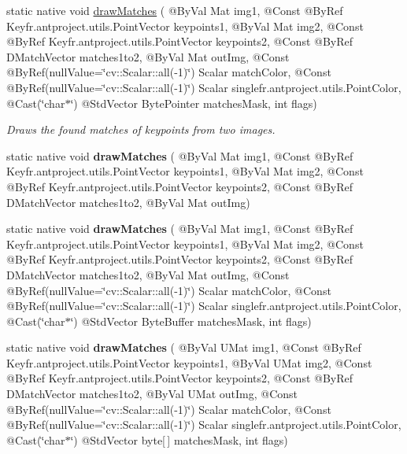 \begin{DoxyCompactItemize}
\item 
static native void \hyperlink{group__features2d__draw_gac84f37b93a8b6d5358211ec9b6d4799e}{draw\+Matches} ( @By\+Val Mat img1, @Const @By\+Ref Key\+fr.antproject.utils.Point\+Vector keypoints1, @By\+Val Mat img2, @Const @By\+Ref Key\+fr.antproject.utils.Point\+Vector keypoints2, @Const @By\+Ref D\+Match\+Vector matches1to2, @By\+Val Mat out\+Img, @Const @By\+Ref(null\+Value=\char`\"{}cv\+::\+Scalar\+::all(-\/1)\char`\"{}) Scalar match\+Color, @Const @By\+Ref(null\+Value=\char`\"{}cv\+::\+Scalar\+::all(-\/1)\char`\"{}) Scalar single\+fr.antproject.utils.Point\+Color, @Cast(\char`\"{}char$\ast$\char`\"{}) @Std\+Vector Byte\+Pointer matches\+Mask, int flags)
\begin{DoxyCompactList}\small\item\em Draws the found matches of keypoints from two images. \end{DoxyCompactList}\item 
static native void {\bfseries draw\+Matches} ( @By\+Val Mat img1, @Const @By\+Ref Key\+fr.antproject.utils.Point\+Vector keypoints1, @By\+Val Mat img2, @Const @By\+Ref Key\+fr.antproject.utils.Point\+Vector keypoints2, @Const @By\+Ref D\+Match\+Vector matches1to2, @By\+Val Mat out\+Img)
\item 
static native void {\bfseries draw\+Matches} ( @By\+Val Mat img1, @Const @By\+Ref Key\+fr.antproject.utils.Point\+Vector keypoints1, @By\+Val Mat img2, @Const @By\+Ref Key\+fr.antproject.utils.Point\+Vector keypoints2, @Const @By\+Ref D\+Match\+Vector matches1to2, @By\+Val Mat out\+Img, @Const @By\+Ref(null\+Value=\char`\"{}cv\+::\+Scalar\+::all(-\/1)\char`\"{}) Scalar match\+Color, @Const @By\+Ref(null\+Value=\char`\"{}cv\+::\+Scalar\+::all(-\/1)\char`\"{}) Scalar single\+fr.antproject.utils.Point\+Color, @Cast(\char`\"{}char$\ast$\char`\"{}) @Std\+Vector Byte\+Buffer matches\+Mask, int flags)
\item 
static native void {\bfseries draw\+Matches} ( @By\+Val U\+Mat img1, @Const @By\+Ref Key\+fr.antproject.utils.Point\+Vector keypoints1, @By\+Val U\+Mat img2, @Const @By\+Ref Key\+fr.antproject.utils.Point\+Vector keypoints2, @Const @By\+Ref D\+Match\+Vector matches1to2, @By\+Val U\+Mat out\+Img, @Const @By\+Ref(null\+Value=\char`\"{}cv\+::\+Scalar\+::all(-\/1)\char`\"{}) Scalar match\+Color, @Const @By\+Ref(null\+Value=\char`\"{}cv\+::\+Scalar\+::all(-\/1)\char`\"{}) Scalar single\+fr.antproject.utils.Point\+Color, @Cast(\char`\"{}char$\ast$\char`\"{}) @Std\+Vector byte\mbox{[}$\,$\mbox{]} matches\+Mask, int flags)
\item 

\end{DoxyCompactItemize}
